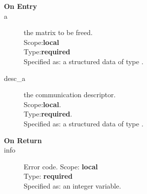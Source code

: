 
\begin{description}
\item[\bf On Entry]
\item[a] the matrix to be freed.\\
Scope:{\bf local}\\
Type:{\bf required}\\
Specified as: a structured data of type \spdata.
\item[desc\_a] the communication descriptor.\\
Scope:{\bf local}.\\
Type:{\bf required}.\\
Specified as: a structured data of type \descdata.
\end{description}

\begin{description}
\item[\bf On Return]
\item[info] Error code.
Scope: {\bf local} \\
Type: {\bf required}\\
Specified as: an integer variable.
\end{description}



%
%


